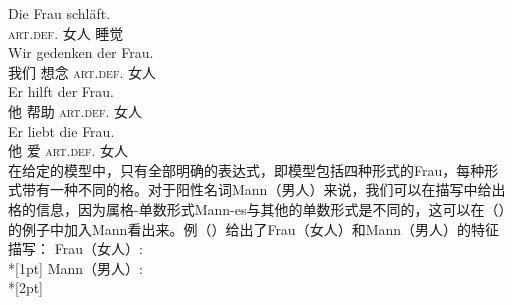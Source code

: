 \eal\settowidth{}
\ex 
\gll Die        Frau schläft. \\      
     \textsc{art}.\textsc{def}.\nom{} 女人 睡觉\\
\ex 
\gll Wir gedenken der Frau. \\ 
     我们 想念 \textsc{art}.\textsc{def}.\gen{} 女人\\
\ex 
\gll Er hilft der Frau.  \\    
     他 帮助 \textsc{art}.\textsc{def}.\dat{} 女人\\
\ex 
\gll Er liebt die Frau.   \\   
     他 爱 \textsc{art}.\textsc{def}.\acc{} 女人\\
\zl
在给定的模型中，只有全部明确的表达式，即模型包括四种形式的Frau，每种形式带有一种不同的格。对于阳性名词Mann（男人）来说，我们可以在描写中给出格的信息，因为属格-单数形式Mann-es与其他的单数形式是不同的，这可以在（）的例子中加入Mann看出来。例（）给出了Frau（女人）和Mann（男人）的特征描写：
\eal
\ex\label{avm-frau}
Frau（女人）:\\*[1pt]
\ex\label{avm-mann}
Mann（男人）:\\*[2pt]
